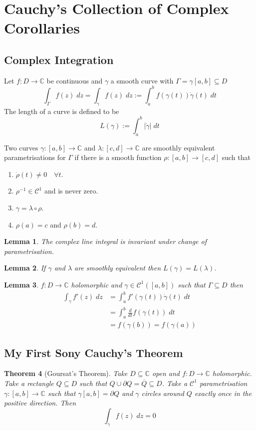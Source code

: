 \documentclass[11pt]{article}
\newcommand{\defeq}{:=}
\newcommand{\abs}[1]{\left|#1\right|}
\newcommand{\C}{\mathbb{C}}
\newenvironment{defin}
	{\begin{mdframed}[backgroundcolor=white, roundcorner=5pt, linewidth=1pt]}
	{\end{mdframed}}
\newcommand{\mdf}[1]{{\color{red} #1}}
\newtheorem{theorem}{Theorem}[section]
\newtheorem{lemma}[theorem]{Lemma}
\begin{document}
\section{Cauchy's Collection of Complex Corollaries}

\subsection{Complex Integration}
\begin{defin}
	Let $f:D\to\C$ be continuous and $\gamma$ a smooth curve with $\Gamma=\gamma[a,b]\subseteq D$
	\[
		\int_\Gamma f(z)\;dz=\int_\gamma f(z)\;dz \defeq \int_a^bf(\gamma(t))\dot{\gamma}(t)\; dt
	\]
	The length of a curve is defined to be
	\[
		L(\gamma)\defeq\int_a^b\abs{\dot{\gamma}}\; dt
	\]

	Two curves $\gamma:[a,b]\to\C$ and $\lambda:[c, d]\to\C$ are \mdf{smoothly equivalent parametrisations} for $\Gamma$ if there is a smooth  function $\rho:[a,b]\to[c, d]$ such that
	\begin{enumerate}[label=(\roman*)]
		\item $\dot{\rho}(t)\neq0 \quad \forall t$.
		\item $\rho^{-1}\in\mathcal{C}^1$ and is never zero.
		\item $\gamma = \lambda \circ \rho$.
		\item $\rho(a)=c$ and $\rho(b)=d$.
	\end{enumerate}
\end{defin}
\begin{lemma}
The complex line integral is invariant under change of parametrisation.
\end{lemma}
\begin{lemma}
If $\gamma$ and $\lambda$ are smoothly equivalent then $L(\gamma)=L(\lambda)$.
\end{lemma}

\begin{lemma}
$f:D\to \C$ holomorphic and $\gamma\in\mathcal{C}^1([a, b])$ such that $\Gamma\subseteq D$ then
\begin{align*}
	\int_\gamma f'(z)\;dz &=\int_a^b f'(\gamma(t))\dot{\gamma}(t)\;dt	\\
						  &=\int_a^b \frac{d}{dt}f(\gamma(t))\;dt \\
						  &=f(\gamma(b)) = f(\gamma(a))
\end{align*}
\end{lemma}

\subsection{My First Sony Cauchy's Theorem}
\begin{theorem}[Goursat's Theorem]
Take $D\subseteq \C$ open and $f:D\to\C$ holomorphic.
Take a rectangle $Q\subseteq D$ such that $Q\cup \partial Q = \overline{Q}\subseteq D$.
Take a $\mathcal{C}^1$ parametrisation $\gamma:[a, b]\to\C$ such that $\gamma[a, b]=\partial Q$ and $\gamma$ circles around $Q$ exactly once in the positive direction.
Then
\[
	\int_\gamma f(z)\; dz =0
\]
\end{theorem}
\end{document}
